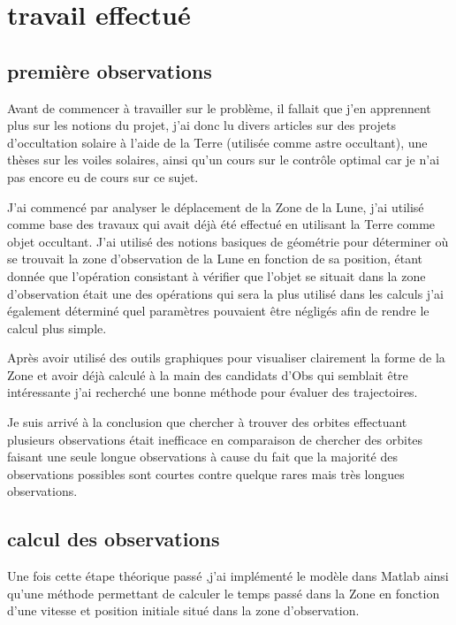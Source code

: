 \documentclass{article} %
\begin{document}
		\newpage
		\section{travail effectué}
		
		\subsection{première observations}
		Avant de commencer à travailler sur le problème, il fallait que j'en apprennent plus sur les notions du projet, j'ai donc lu divers articles sur des projets d'occultation solaire à l'aide de la Terre (utilisée comme astre occultant), une thèses sur les voiles solaires, ainsi qu'un cours sur le contrôle optimal car je n'ai pas encore eu de cours sur ce sujet.
		
		J'ai commencé par analyser le déplacement de la \gls{Zone} de la Lune, j'ai utilisé comme base des travaux qui avait déjà été effectué en utilisant la Terre comme objet occultant. J'ai utilisé des notions basiques de géométrie pour déterminer où se trouvait la zone d'observation de la Lune en fonction de sa position, étant donnée que l'opération consistant à vérifier que l'objet se situait dans la zone d'observation était une des opérations qui sera la plus utilisé dans les calculs j'ai également déterminé quel paramètres pouvaient être négligés afin de rendre le calcul plus simple.
		
		Après avoir utilisé des outils graphiques pour visualiser clairement la forme de la \gls{Zone} et avoir déjà calculé à la main des candidats d'\gls{Obs} qui semblait être intéressante j'ai recherché une bonne méthode pour évaluer des trajectoires.
		
		Je suis arrivé à la conclusion que chercher à trouver des orbites effectuant plusieurs observations était inefficace en comparaison de chercher des orbites faisant une seule longue observations à cause du fait que la majorité des observations possibles sont courtes contre quelque rares mais très longues observations.
		
		\subsection{calcul des observations}
		Une fois cette étape théorique passé ,j'ai implémenté le modèle dans Matlab ainsi qu'une méthode permettant de calculer le temps passé dans la \gls{Zone} en fonction d'une vitesse et position initiale situé dans la zone d'observation.\\
		
\end{document}
